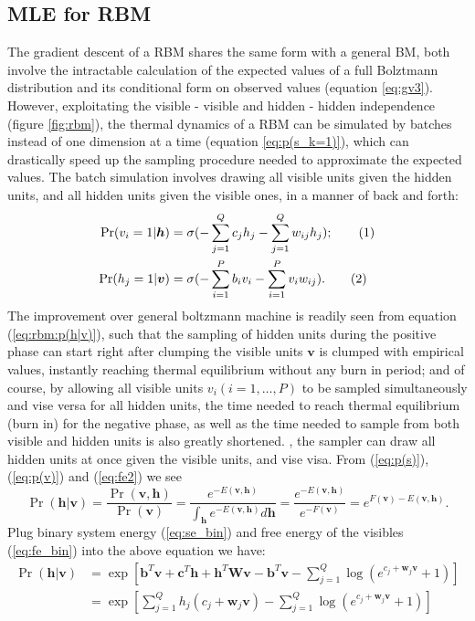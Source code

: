 \documentclass[11pt]{article}
\newcommand\numberthis{\addtocounter{equation}{1}\tag{\theequation}}
\newcommand{\vb}{\boldsymbol{b}}
\newcommand{\vc}{\boldsymbol{c}}
\newcommand{\vh}{\boldsymbol{h}}
\newcommand{\vv}{\boldsymbol{v}}
\newcommand{\vw}{\boldsymbol{w}}
\newcommand{\mw}{\boldsymbol{W}}
\begin{document}
{\subsection{MLE for RBM}
The gradient descent of a RBM shares the same form with a general BM, both involve the intractable calculation of the expected values of a full Bolztmann distribution and its conditional form on observed values (equation \ref{eq:gv3}). However, exploitating the visible - visible and hidden - hidden independence (figure \ref{fig:rbm}), the thermal dynamics of a RBM can be simulated by batches instead of one dimension at a time (equation \ref{eq:p(s_k=1)}), which can drastically speed up the sampling procedure needed to approximate the expected values. The batch simulation involves drawing all visible units given the hidden units, and all hidden units given the visible ones, in a manner of back and forth:
\begin{align*}
  \Pr(v_i=1|\vh) & = \sigma(-\sum_{j=1}^Q{c_j h_j} -\sum_{j=1}^Q{w_{ij} h_j}); \numberthis \label{eq:rbm:p(v|h)} \\
  \Pr(h_j=1|\vv) & = \sigma(-\sum_{i=1}^P{b_i v_i} -\sum_{i=1}^P{v_i w_{ij}}). \numberthis \label{eq:rbm:p(h|v)}
\end{align*}
The improvement over general boltzmann machine is readily seen from equation (\ref{eq:rbm:p(h|v)}), such that the sampling of hidden units during the positive phase can start right after clumping the visible units $\vv$ is clumped with empirical values, instantly reaching thermal equilibrium without any burn in period; and of course, by allowing all visible units $v_i (i=1, \dots, P)$ to be sampled simultaneously and vise versa for all hidden units, the time needed to reach thermal equilibrium (burn in) for the negative phase, as well as the time needed to sample from both visible and hidden units is also greatly shortened.
 , the sampler can draw all hidden units at once given the visible units, and vise visa. From (\ref{eq:p(s)}), (\ref{eq:p(v)}) and (\ref{eq:fe2}) we see
\[  \Pr(\vh|\vv) = \frac{\Pr(\vv, \vh)}{\Pr(\vv)} = \frac{e^{-E(\vv, \vh)}}{\int_{\vh}{e^{-E(\vv, \vh)}d\vh}} = \frac{e^{-E(\vv, \vh)}}{e^{-F(\vv)}} = e^{F(\vv) - E(\vv, \vh)}.  \]
Plug binary system energy (\ref{eq:se_bin}) and free energy of the visibles (\ref{eq:fe_bin}) into the above equation we have:
\begin{align*}
  \Pr(\vh|\vv) &= \exp\left[\vb^T \vv + \vc^T \vh + \vh^T \mw \vv -\vb^T\vv - \sum_{j=1}^Q{\log{(e^{c_j+\vw_j\vv} + 1)}}\right] \\
               &= \exp\left[\sum_{j=1}^Q{h_j(c_j+\vw_j\vv)}-\sum_{j=1}^Q{\log{(e^{c_j+\vw_j\vv}+1)}}\right] \\

\end{align*}}
\end{document}
